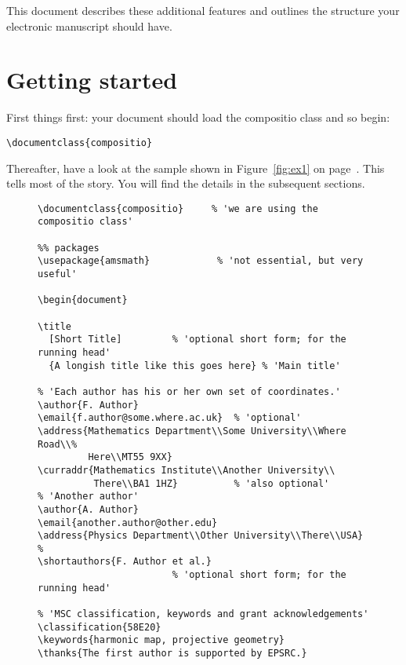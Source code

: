 \documentclass[noams]{compositio}
\newcommand*{\pkg}[1]{{\mdseries\textsf{#1}}}
\begin{document}
This document describes these additional features and outlines the
structure your electronic manuscript should have.

\section{Getting started}
\label{sec:getting-started}
First things first: your document should load the \pkg{compositio}
class and so begin:
\begin{verbatim}
\documentclass{compositio}
\end{verbatim}
Thereafter, have a look at the sample shown in
Figure~\ref{fig:ex1} on page~\pageref{fig:ex1}.  This tells most
of the story. You will find the details in the subsequent sections.
\begin{figure}[!t]\vspace*{6pt}
\hspace*{1in}\begin{minipage}{5.1in}\small\begin{verbatim}
\documentclass{compositio}     % 'we are using the compositio class'

%% packages
\usepackage{amsmath}            % 'not essential, but very useful'

\begin{document}

\title
  [Short Title]         % 'optional short form; for the running head'
  {A longish title like this goes here} % 'Main title'

% 'Each author has his or her own set of coordinates.'
\author{F. Author}
\email{f.author@some.where.ac.uk}  % 'optional'
\address{Mathematics Department\\Some University\\Where Road\\%
         Here\\MT55 9XX}
\curraddr{Mathematics Institute\\Another University\\
          There\\BA1 1HZ}          % 'also optional'
% 'Another author'
\author{A. Author}
\email{another.author@other.edu}
\address{Physics Department\\Other University\\There\\USA}
%
\shortauthors{F. Author et al.}
                        % 'optional short form; for the running head'

% 'MSC classification, keywords and grant acknowledgements'
\classification{58E20}
\keywords{harmonic map, projective geometry}
\thanks{The first author is supported by EPSRC.}


\end{verbatim}
\end{minipage}
\end{figure}
\end{document}
